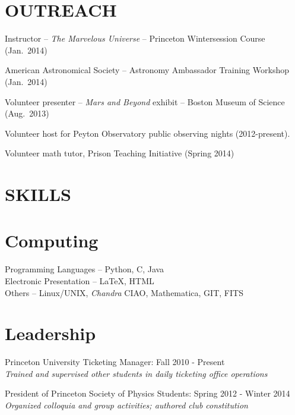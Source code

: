 \documentclass[margin]{res}
\begin{document}
\begin{resume}
\section{OUTREACH}
Instructor -- \textit{The Marvelous Universe} -- Princeton Wintersession Course (Jan.~2014)

American Astronomical Society -- Astronomy Ambassador Training Workshop (Jan.~2014)

Volunteer presenter -- \textit{Mars and
                    Beyond} exhibit -- Boston Museum of Science (Aug.~2013)

Volunteer host for Peyton Observatory public
    observing nights (2012-present).

Volunteer math tutor, Prison Teaching
    Initiative (Spring 2014)

\section{SKILLS}
\normalsize{\section{Computing}}
Programming Languages -- Python, C, Java\\
Electronic Presentation -- \LaTeX, HTML\\
Others -- Linux/UNIX, \textit{Chandra} CIAO, Mathematica, GIT, FITS
\normalsize{\section{Leadership}}
Princeton University Ticketing Manager: Fall 2010 - Present\\
\textit{Trained and supervised other students in daily ticketing office operations}

President of Princeton Society of Physics
Students: Spring 2012 - Winter 2014 \\
\textit{Organized colloquia and group activities; authored club constitution}

\end{resume} 
\end{document}
